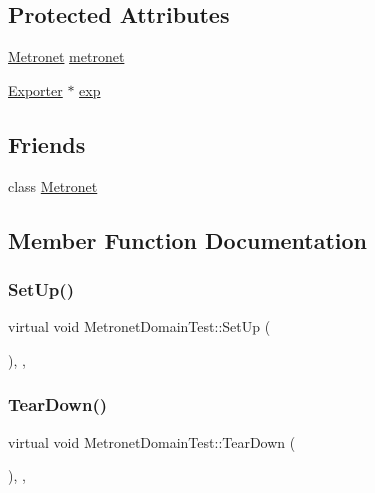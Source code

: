 \subsection*{Protected Attributes}
\begin{DoxyCompactItemize}
\item 
\hyperlink{class_metronet}{Metronet} \hyperlink{class_metronet_domain_test_aa185f99af6607124a6fea8c4f63fddb7}{metronet}
\item 
\hyperlink{class_exporter}{Exporter} $\ast$ \hyperlink{class_metronet_domain_test_a6e7c903d4485d95a766f8ff01989d529}{exp}
\end{DoxyCompactItemize}
\subsection*{Friends}
\begin{DoxyCompactItemize}
\item 
class \hyperlink{class_metronet_domain_test_a07c94fb69880743e62f64a941fc2d4ab}{Metronet}
\end{DoxyCompactItemize}


\subsection{Member Function Documentation}
\mbox{\label{class_metronet_domain_test_ac8e8d15b45d53810c4427084fad6388f}} 
\subsubsection{\texorpdfstring{Set\+Up()}{SetUp()}}
{\footnotesize\ttfamily virtual void Metronet\+Domain\+Test\+::\+Set\+Up (\begin{DoxyParamCaption}{ }\end{DoxyParamCaption})\hspace{0.3cm}{\ttfamily [inline]}, {\ttfamily [protected]}, {\ttfamily [virtual]}}

\mbox{\label{class_metronet_domain_test_a3429b373771815652c80d013f81369a0}} 
\subsubsection{\texorpdfstring{Tear\+Down()}{TearDown()}}
{\footnotesize\ttfamily virtual void Metronet\+Domain\+Test\+::\+Tear\+Down (\begin{DoxyParamCaption}{ }\end{DoxyParamCaption})\hspace{0.3cm}{\ttfamily [inline]}, {\ttfamily [protected]}, {\ttfamily [virtual]}}



